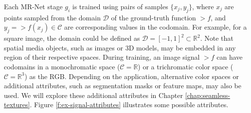 
Each MR-Net stage \( g_i \) is trained using pairs of samples \(\{x_j, y_j\}\), where \( x_j \) are points sampled from the domain \(\mathcal{D}\) of the ground-truth function \(\gt{f}\), and \( y_j = \gt{f}(x_j) \in \mathcal{C} \) are corresponding values in the codomain. For example, for a square image, the domain could be defined as \(\mathcal{D} = [-1, 1]^2 \subset \mathbb{R}^{2}\). Note that spatial media objects, such as images or 3D models, may be embedded in any region of their respective spaces. During training, an image signal \(\gt{f}\) can have codomains in a monochromatic space (\(\mathcal{C} = \mathbb{R}\)) or a trichromatic color space (\(\mathcal{C} = \mathbb{R}^3\)) as the RGB. Depending on the application, alternative color spaces or additional attributes, such as segmentation masks or feature maps, may also be used. We will explore these additional attributes in Chapter \ref{chap:seamless-textures}. Figure \ref{f:ex-signal-attributes} illustrates some possible attributes.

